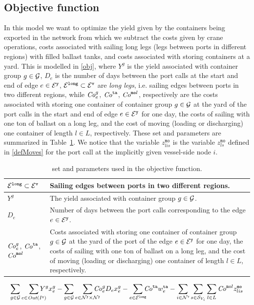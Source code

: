 \subsection{Objective function}
In this model we want to optimize the yield given by the containers being exported in the network from which we subtract the costs given by crane operations, costs associated with sailing long legs (legs between ports in different regions) with filled ballast tanks, and costs associated with storing containers at a yard. This is modelled in \eqref{obj}, where $Y^g$ is the yield associated with container group $g\in\mathcal{G}$, $D_e$ is the number of days between the port calls at the start and end of edge $e\in \mathcal{E}^\texttt{y}$, $\mathcal{E}^\texttt{long}\subset\mathcal{E}^\texttt{v}$ are \emph{long legs}, i.e. sailing edges between ports in two different regions, while $\mathit{Co}^g_{e}$, $\mathit{Co}^\texttt{ta}$, $\mathit{Co}^{\texttt{mo}l}$, respectively are the costs associated with storing one container of container group $g\in\mathcal{G}$ at the yard of the port calls in the start and end of edge $e\in\mathcal{E}^\texttt{y}$ for one day, the costs of sailing with one ton of ballast on a long leg, and the cost of moving (loading or discharging) one container of length $l\in L$, respectively. These set and parameters are summarized in Table~\ref{tab:obj}. {We notice that the variable $z^{\texttt{mo}}_{lis}$ is the variable $z^\texttt{mo}_{ls}$ defined in \eqref{defMoves} for the port call at the implicitly given vessel-side node $i$.}

\begin{table}
\centering
\btsize
\begin{tabular}{lp{10cm}}
$\mathcal{E}^\texttt{long}\subset\mathcal{E}^\texttt{v}$ & Sailing edges between ports in two different regions.\\
\hline
$Y^g$ 		& The yield associated with container group $g\in\mathcal{G}$.\\
$D_e$ 		& Number of days between the port calls corresponding to the edge $e\in\mathcal{E}^\texttt{y}$.\\
$\mathit{Co}^g_e$, $\mathit{Co}^\texttt{ta}$, $\mathit{Co}^{\texttt{mo}l}$ & Costs associated with storing one container of container group $g\in\mathcal{G}$ at the yard of the port of the edge $e\in\mathcal{E}^\texttt{y}$ for one day, the costs of sailing with one ton of ballast on a long leg, and the cost of moving (loading or discharging) one container of length $l\in L$, respectively.
\end{tabular}
\etsize
\caption{set and parameters used in the objective function.}\label{tab:obj}
\end{table}

\begin{equation}\label{obj}
\sum_{g\in\mc{G}}\so[r]{\sum_{e\in\mi{Out}(I^\ttt{x})}}Y^g x^g_{e} 
- \sum_{g\in\mc{G}}\so[r]{\sum_{e\in \mc{N}^\ttt{y}\times\mc{N}^\ttt{y}}} \mi{Co}^g_e D_e x^g_e 
- \so[r]{\sum_{e\in\mc{E}^\ttt{long}}} \mi{Co}^\ttt{ta} w^\ttt{ta}_e 
-\sum_{i\in \mc{N}^\ttt{v}}\sum_{s\in\mc{S}_{V_i}}\sum_{l\in L} \mi{Co}^{\ttt{mo}l} z^{\ttt{mo}}_{lis}
\end{equation}
